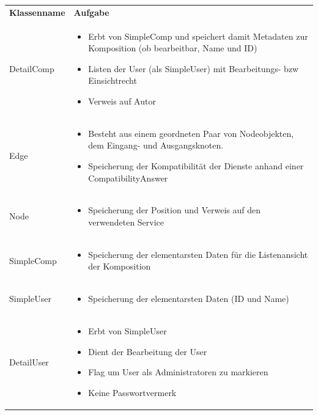 \begin{table}
	\begin{tabularx}{\textwidth}{p{} | X}
		\rowcolor[HTML]{C0C0C0}
		\textbf{Klassenname} & \textbf{Aufgabe} \\
		DetailComp & \compress \begin{itemize}
			\item Erbt von SimpleComp und speichert damit Metadaten zur Komposition (ob bearbeitbar, Name und ID)
			\item Listen der User (als SimpleUser) mit Bearbeitungs- bzw Einsichtrecht
			\item Verweis auf Autor
		\end{itemize}\\
		\rowcolor[HTML]{E7E7E7}
		Edge & \compress \begin{itemize}
		  \item Besteht aus einem geordneten Paar von Nodeobjekten, dem Eingang- und Ausgangsknoten.
			\item Speicherung der Kompatibilität der Dienste anhand einer CompatibilityAnswer
		\end{itemize}\\
		Node & \compress \begin{itemize}
			\item Speicherung der Position und Verweis auf den verwendeten Service
		\end{itemize}\\
		\rowcolor[HTML]{E7E7E7}
		SimpleComp & \compress \begin{itemize}
			\item Speicherung der elementarsten Daten für die Listenansicht der Komposition
		\end{itemize}\\
		SimpleUser  & \compress \begin{itemize}
			\item Speicherung der elementarsten Daten (ID und Name)
		\end{itemize}\\
		\rowcolor[HTML]{E7E7E7}
		DetailUser & \compress \begin{itemize}
			\item Erbt von SimpleUser
			\item Dient der Bearbeitung der User
			\item Flag um User als Administratoren zu markieren
			\item Keine Passwortvermerk
		\end{itemize}\\

\end{tabularx}
\end{table}
